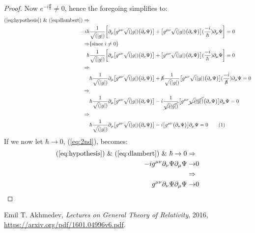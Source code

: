 \documentclass[]{article}
\newcommand\numberthis{\addtocounter{equation}{1}\tag{\theequation}}
\begin{document}
\begin{proof}
Now $e^{-i\frac{\Psi}{\hbar}}\neq0$, hence the foregoing simplifies to:
\begin{align*}
		\text{(\ref{eq:hypothesis}) \& (\ref{eq:dlambert})} \Rightarrow&\\
			-i \hbar& \frac{1}{\sqrt(|g|)} \bigg[\partial_{\mu}\big[g^{\mu\nu}\sqrt(|g|)\big(\partial_{\nu}\Psi\big)\big]  + \big[g^{\mu\nu}\sqrt(|g|)\big(\partial_{\nu}\Psi\big)\big](\frac{-i}{\hbar}) \partial_{\mu}\Psi\bigg]=0\\
			 \Rightarrow& \text{\{since $i\neq0$\}}\\
			\hbar& \frac{1}{\sqrt(|g|)} \bigg[\partial_{\mu}\big[g^{\mu\nu}\sqrt(|g|)\big(\partial_{\nu}\Psi\big)\big]  + \big[g^{\mu\nu}\sqrt(|g|)\big(\partial_{\nu}\Psi\big)\big](\frac{-i}{\hbar}) \partial_{\mu}\Psi\bigg]=0 \\
			\Rightarrow&\\
			 &\hbar \frac{1}{\sqrt(|g|)}\partial_{\mu}\big[g^{\mu\nu}\sqrt(|g|)\big(\partial_{\nu}\Psi\big)\big]  + \cancel{\hbar} \frac{1}{\sqrt(|g|)}\big[g^{\mu\nu}\sqrt(|g|)\big(\partial_{\nu}\Psi\big)\big](\frac{-i}{\cancel{\hbar}}) \partial_{\mu}\Psi=0 \\
			 \Rightarrow&\\
			 &\hbar \frac{1}{\sqrt(|g|)}\partial_{\mu}\big[g^{\mu\nu}\sqrt(|g|)\big(\partial_{\nu}\Psi\big)\big]  -i  \frac{1}{\cancel{\sqrt(|g|)}}\big[g^{\mu\nu}\cancel{\sqrt(|g|)}\big(\partial_{\nu}\Psi\big)\big] \partial_{\mu}\Psi=0\\
			 \Rightarrow&\\
			 &\hbar \frac{1}{\sqrt(|g|)}\partial_{\mu}\big[g^{\mu\nu}\sqrt(|g|)\big(\partial_{\nu}\Psi\big)\big]  -i  \big[g^{\mu\nu}\big(\partial_{\nu}\Psi\big)\big] \partial_{\mu}\Psi=0 \numberthis\label{eq:2nd}
\end{align*}
If we now let $\hbar \rightarrow 0$, (\ref{eq:2nd}), becomes:
\begin{align*}
	\text{(\ref{eq:hypothesis}) \& (\ref{eq:dlambert}) \& } \hbar \rightarrow 0 \Rightarrow&\\
	-i  g^{\mu\nu}\partial_{\nu}\Psi \partial_{\mu}\Psi\rightarrow&0\\
	 \Rightarrow&\\
	g^{\mu\nu}\partial_{\nu}\Psi \partial_{\mu}\Psi\rightarrow&0 
\end{align*}
\end{proof}

\begin{thebibliography}{9}
	
	Emil T. Akhmedev,
	\emph{Lectures on General Theory of Relativity},
	2016,
	\url{https://arxiv.org/pdf/1601.04996v6.pdf}.
	

\end{thebibliography}
\end{document}

